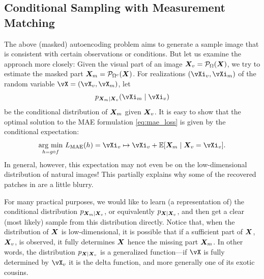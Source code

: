 \documentclass[../../book-main.tex]{subfiles}
\begin{document}




\subsection{Conditional Sampling with Measurement Matching}
\label{sec:conditioned-decoding}
The above (masked) autoencoding problem aims to generate a sample image that is consistent with certain observations or conditions. But let us examine the approach more closely: Given the
visual part of an image $\bm{X}_v = \mathcal{P}_{\Omega}(\bm{X})$, we try to
estimate the masked part $\bm{X}_m = \mathcal{P}_{\Omega^c}(\bm{X})$. For realizations
$(\vXi_v, \vXi_m)$ of the random variable $\vX=(\vX_v, \vX_m)$, let
\[p_{\X_m \mid \X_v}(\vXi_m\mid \vXi_v)\]
be the conditional distribution of $\bm{X}_m$ given
$\bm{X}_v$. It is easy to show that the optimal solution to the  MAE
formulation \eqref{eq:mae_loss} is given by the conditional expectation:
\begin{equation}
  \argmin_{h = g \circ f}\, L_{\mathrm{MAE}}(h)
  = \vXi_v \mapsto \vXi_v + \mathbb{E}[\X_m \mid \X_v=\vXi_v].
\end{equation}
In general, however, this expectation may not even be on the
low-dimensional distribution of natural images! This partially
explains why some of the recovered patches in 
are a little blurry.

For many practical purposes, we would like to learn (a representation
of) the conditional distribution $p_{\bm{X}_m \mid \bm{X}_v}$, or equivalently
$p_{\bm{X} \mid \bm{X}_v}$,
and then get a clear (most likely) sample from this distribution directly. Notice that, when the distribution of $\bm{X}$ is low-dimensional, it is possible that if a
sufficient part of $\bm{X}$, $\bm{X}_v$, is observed, it fully determines
$\bm{X}$ hence the missing part $\bm{X}_m$. In other words, the distribution
$p_{\bm{X} \mid \bm{X}_v}$ is a generalized function---if $\vX$ is fully determined by $\vX_v$ it is the delta function, and more generally one of its exotic cousins.
\end{document}

